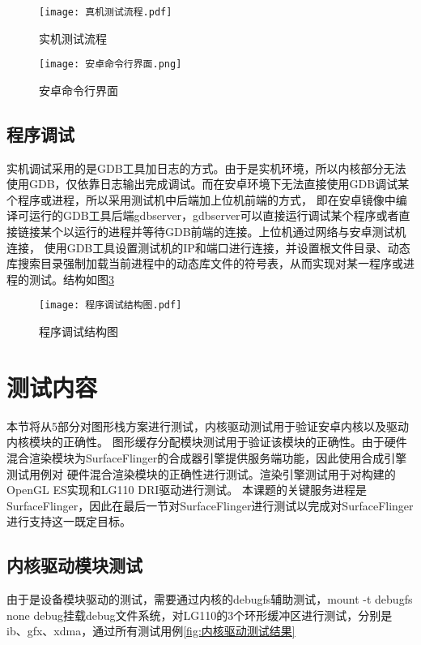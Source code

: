 \begin{figure}[h]
  \centering
  \texttt{[image: 真机测试流程.pdf]}
  \caption{实机测试流程}
  \label{fig:实机测试流程}
\end{figure}

\begin{figure}[h]
  \centering
  \texttt{[image: 安卓命令行界面.png]}
  \caption{安卓命令行界面}
  \label{fig:安卓命令行界面}
\end{figure}

\subsection{程序调试}
实机调试采用的是GDB工具加日志的方式。由于是实机环境，所以内核部分无法使用GDB，仅依靠日志输出完成调试。而在安卓环境下无法直接使用GDB调试某个程序或进程，所以采用测试机中后端加上位机前端的方式，
即在安卓镜像中编译可运行的GDB工具后端gdbserver，gdbserver可以直接运行调试某个程序或者直接链接某个以运行的进程并等待GDB前端的连接。上位机通过网络与安卓测试机连接，
使用GDB工具设置测试机的IP和端口进行连接，并设置根文件目录、动态库搜索目录强制加载当前进程中的动态库文件的符号表，从而实现对某一程序或进程的测试。结构如图\ref{fig:程序调试结构图}

\begin{figure}[h]
  \centering
  \texttt{[image: 程序调试结构图.pdf]}
  \caption{程序调试结构图}
  \label{fig:程序调试结构图}
\end{figure}

\section{测试内容}
本节将从5部分对图形栈方案进行测试，内核驱动测试用于验证安卓内核以及驱动内核模块的正确性。
图形缓存分配模块测试用于验证该模块的正确性。由于硬件混合渲染模块为SurfaceFlinger的合成器引擎提供服务端功能，因此使用合成引擎测试用例对
硬件混合渲染模块的正确性进行测试。渲染引擎测试用于对构建的OpenGL ES实现和LG110 DRI驱动进行测试。
本课题的关键服务进程是SurfaceFlinger，因此在最后一节对SurfaceFlinger进行测试以完成对SurfaceFlinger进行支持这一既定目标。

\subsection{内核驱动模块测试}
由于是设备模块驱动的测试，需要通过内核的debugfs辅助测试，mount -t debugfs none debug挂载debug文件系统，对LG110的3个环形缓冲区进行测试，分别是
ib、gfx、xdma，通过所有测试用例\ref{fig:内核驱动测试结果}

